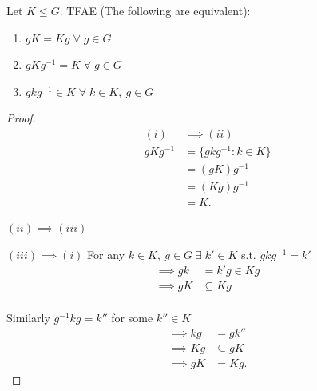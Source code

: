 \begin{proposition}
\protect\hypertarget{prp:four}{}\label{prp:four}

Let \(K \leq G\).
TFAE (The following are equivalent):

\begin{enumerate}
\def\labelenumi{\roman{enumi}.}
\item
  \(gK = Kg \; \forall \; g \in G\)
\item
  \(gKg^{-1} = K \; \forall \; g \in G\)
\item
  \(gkg^{-1} \in K \; \forall \; k \in K,\ g \in G\)
\end{enumerate}

\end{proposition}

\begin{proof}
\begin{align*}
    (i) &\implies (ii) \\
    gKg^{-1} &= \{gkg^{-1} : k \in K \} \\
    &= (gK) g^{-1} \\
    &= (Kg)g^{-1} \\
    &= K.
\end{align*}

\((ii) \implies (iii)\)

\((iii) \implies (i)\) For any \(k \in K,\ g \in G \; \exists \; k' \in K\) s.t. \(gkg^{-1} = k'\)
\begin{align*}
    \implies gk &= k'g \in Kg \\
    \implies gK &\subseteq Kg \\
\end{align*}

Similarly \(g^{-1}kg = k''\) for some \(k'' \in K\)
\begin{align*}
    \implies kg &= gk'' \\
    \implies Kg &\subseteq gK \\
    \implies gK &= Kg.
\end{align*}
\end{proof}


